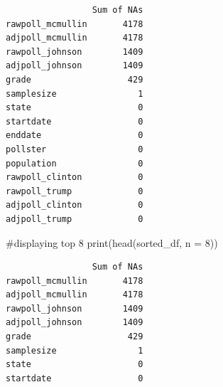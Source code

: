 \documentclass[
  letterpaper,
  DIV=11,
  numbers=noendperiod]{scrartcl}
\newenvironment{Shaded}{\begin{snugshade}}{\end{snugshade}}
\newcommand{\AttributeTok}[1]{\textcolor[rgb]{0.40,0.45,0.13}{#1}}
\newcommand{\CommentTok}[1]{\textcolor[rgb]{0.37,0.37,0.37}{#1}}
\newcommand{\DecValTok}[1]{\textcolor[rgb]{0.68,0.00,0.00}{#1}}
\newcommand{\FunctionTok}[1]{\textcolor[rgb]{0.28,0.35,0.67}{#1}}
\newcommand{\NormalTok}[1]{\textcolor[rgb]{0.00,0.23,0.31}{#1}}
\begin{document}
\begin{verbatim}
                 Sum of NAs
rawpoll_mcmullin       4178
adjpoll_mcmullin       4178
rawpoll_johnson        1409
adjpoll_johnson        1409
grade                   429
samplesize                1
state                     0
startdate                 0
enddate                   0
pollster                  0
population                0
rawpoll_clinton           0
rawpoll_trump             0
adjpoll_clinton           0
adjpoll_trump             0
\end{verbatim}

\begin{Shaded}
\begin{Highlighting}[]
\CommentTok{\#displaying top 8}
\FunctionTok{print}\NormalTok{(}\FunctionTok{head}\NormalTok{(sorted\_df, }\AttributeTok{n =} \DecValTok{8}\NormalTok{))}
\end{Highlighting}
\end{Shaded}

\begin{verbatim}
                 Sum of NAs
rawpoll_mcmullin       4178
adjpoll_mcmullin       4178
rawpoll_johnson        1409
adjpoll_johnson        1409
grade                   429
samplesize                1
state                     0
startdate                 0
\end{verbatim}
\end{document}
